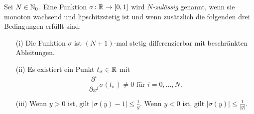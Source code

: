 \begin{defn}
\label{nzulässig}
Sei $N \in \mathbb{N}_0$. Eine Funktion $\sigma\colon \mathbb{R} \to [0, 1]$ wird \emph{$N$-zulässig} genannt, wenn sie monoton wachsend und lipschitzstetig ist und wenn zusätzlich die folgenden drei Bedingungen erfüllt sind:
\begin{itemize}
\item[(i)] Die Funktion $\sigma$ ist $(N + 1)$-mal stetig differenzierbar mit beschränkten Ableitungen.
\item[(ii)] Es existiert ein Punkt $t_{\sigma} \in \mathbb{R}$ mit $$\frac{\partial^i}{\partial x^i}\sigma(t_{\sigma}) \neq 0 \text{ für } i = 0,\dots,N.$$
\item[(iii)] Wenn $y > 0$ ist, gilt $|\sigma(y) - 1| \leq \frac{1}{y}$. Wenn $y < 0$ ist, gilt $|\sigma(y)| \leq \frac{1}{|y|}$.
\end{itemize}  
\end{defn}  

